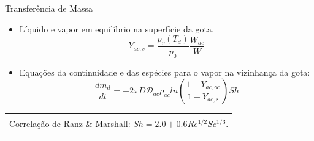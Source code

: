 \documentclass[bars,mathserif]{beamer}
\begin{document}
\begin{frame}
\begin{block}{Transferência de Massa}
 \begin{itemize}
  \item<2-> Líquido e vapor em equilíbrio na superfície da gota.
  \begin{equation*}
  Y_{ac,s} = \frac{p_v \left(T_d\right)}{p_0}\frac{W_{ac}}{W} 
  \end{equation*}
  \item<3-> Equações da continuidade e das espécies para o vapor na vizinhança da gota:
\begin{equation*}
 \frac{dm_d}{dt} = -2\pi D \mathcal{D}_{ac} \rho_{ac} ln \left(
\frac{1-Y_{ac,\infty}}{1-Y_{ac,s}} \right) Sh 
\end{equation*}
 \end{itemize}
\end{block}

\vspace{10pt}
\footnotesize
\begin{tabular}{|l|}
\hline \\
Correlação de Ranz \& Marshall:  $ Sh = 2.0 +0.6 Re^{1/2} Sc^{1/3}$.\\ \\
\hline 
\end{tabular}
\end{frame}
%
\end{document}
